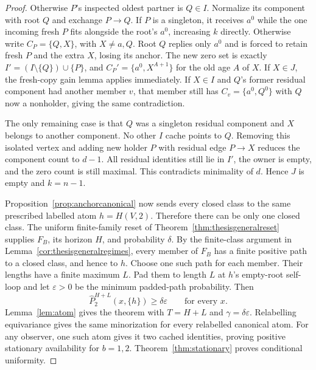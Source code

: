 \documentclass[11pt]{article}
\begin{document}
\begin{proof}
Otherwise $P$'s inspected oldest partner is $Q\in I$.
Normalize its component with root $Q$ and exchange
$P\to Q$. If $P$ is a singleton, it receives $a^0$
while the one incoming fresh $P$ fits alongside the
root's $a^0$, increasing $k$ directly.
Otherwise write $C_P=\{Q,X\}$, with $X\ne a,Q$.
Root $Q$ replies only $a^0$ and is forced to retain
fresh $P$ and the extra $X$, losing its anchor. The new
zero set is exactly $I'=(I\setminus\{Q\})\cup\{P\}$,
and $C_P'=\{a^0,X^{A+1}\}$ for the old age $A$ of $X$.
If $X\in J$, the fresh-copy gain lemma applies immediately.
If $X\in I$ and $Q$'s former residual component had
another member $v$, that member still has
$C_v=\{a^0,Q^0\}$ with $Q$ now a nonholder, giving
the same contradiction.

The only remaining case is that $Q$ was a singleton
residual component and $X$ belongs to another component.
No other $I$ cache points to $Q$. Removing this isolated
vertex and adding new holder $P$ with residual edge
$P\to X$ reduces the component count to $d-1$.
All residual identities still lie in $I'$, the owner
is empty, and the zero count is still maximal. This
contradicts minimality of $d$. Hence $J$ is empty and
$k=n-1$.

Proposition~\ref{prop:anchorcanonical} now sends every
closed class to the same prescribed labelled atom
$h=H(V,2)$. Therefore there can be only one closed
class. The uniform finite-family reset of
Theorem~\ref{thm:thesisgeneralreset} supplies $F_B$, its
horizon $H$, and probability $\delta$.
By the finite-class argument in
Lemma~\ref{cor:thesisgeneralregimes}, every member
of $F_B$ has a finite positive path to a closed class,
and hence to $h$. Choose one such path for each member.
Their lengths have a finite maximum $L$.
Pad them to length $L$ at $h$'s empty-root self-loop and
let $\varepsilon>0$ be the minimum padded-path probability.
Then
\[
 \widehat P_2^{H+L}(x,\{h\})\ge\delta\varepsilon
 \qquad\text{for every }x.
\]
Lemma~\ref{lem:atom} gives the theorem with
$T=H+L$ and $\gamma=\delta\varepsilon$.
Relabelling equivariance gives the same minorization
for every relabelled canonical atom. For any observer,
one such atom gives it two cached identities, proving
positive stationary availability for $b=1,2$.
Theorem~\ref{thm:stationary} proves conditional uniformity.
\end{proof}
\end{document}
